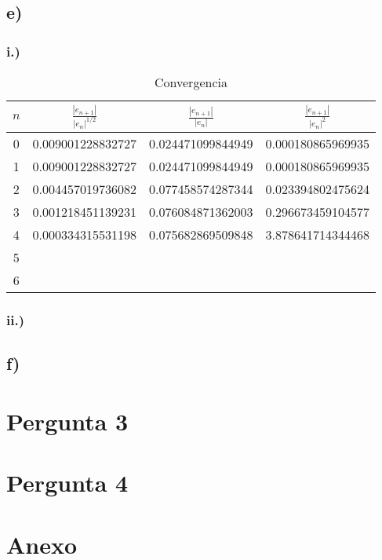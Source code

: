 \documentclass[a4paper, 12pt]{article}
\begin{document}
\subsection*{e)}
\subsubsection*{i.)}

\begin{table}[H] \label{convergencia}
\setlength{\tabcolsep}{0.5cm} %
\renewcommand{\arraystretch}{1.5} %
\centering
\caption{Convergencia}
\label{my-label}
\begin{tabular}{c|c|c|c}

 $n$ & $\frac{|e_{n+1}|}{|e_n|^{1/2}}$ &  $\frac{|e_{n+1}|}{|e_n|}$ & $\frac{|e_{n+1}|}{|e_n|^{2}}$ \\\hline
 0& 0.009001228832727  & 0.024471099844949 & 0.000180865969935 \\
 1& 0.009001228832727  & 0.024471099844949 & 0.000180865969935 \\
 2& 0.004457019736082  & 0.077458574287344 & 0.023394802475624 \\
 3& 0.001218451139231  & 0.076084871362003 & 0.296673459104577 \\
 4& 0.000334315531198  & 0.075682869509848 & 3.878641714344468 \\
 5&  &  & \\
 6&  &  & \\
\end{tabular}
\end{table}


\subsubsection*{ii.)}
\subsection*{f)}

\section{Pergunta 3}

\section{Pergunta 4}

\section{Anexo}
\end{document}
